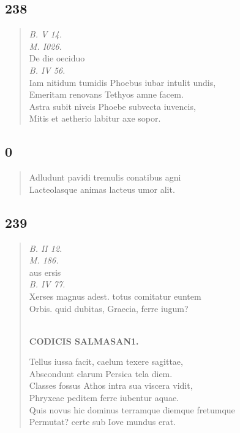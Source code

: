 \documentclass[11pt, a4paper]{report}
\begin{document}
            \subsection*{238}
      \begin{verse}
      \textit{B. V 14.} \\ \textit{M. I026.} \\ De  \lbrack die oeciduo \\ \textit{B. IV 56.} \\ Iam nitidum tumidis Phoebus iubar intulit undis, \\ Emeritam renovans Tethyos amne facem. \\ Astra subit niveis Phoebe subvecta iuvencis, \\ Mitis et aetherio labitur axe sopor. \\ 
      \end{verse}
  
            \subsection*{0}
      \begin{verse}
      Adludunt pavidi tremulis conatibus agni \\ Lacteolasque animas lacteus umor alit. \\ 
      \end{verse}
  
            \subsection*{239}
      \begin{verse}
      \textit{B. II 12.} \\ \textit{M. 186.} \\ aus ersis \\ \textit{B. IV 77.} \\ Xerses magnus adest. totus comitatur euntem \\ Orbis. quid dubitas, Graecia, ferre iugum? \\ 
        ﻿\pagebreak 
    \begin{center} \textbf{CODICIS SALMASAN1.} \end{center} \marginpar{[197]} Tellus iussa facit, caelum texere sagittae, \\ Abscondunt clarum Persica tela diem. \\ Classes fossus Athos intra sua viscera vidit, \\ Phryxeae peditem ferre iubentur aquae. \\ Quis novus hic dominus terramque diemque fretumque \\ Permutat? certe sub Iove mundus erat. \\ 
      \end{verse}
  
\end{document}

